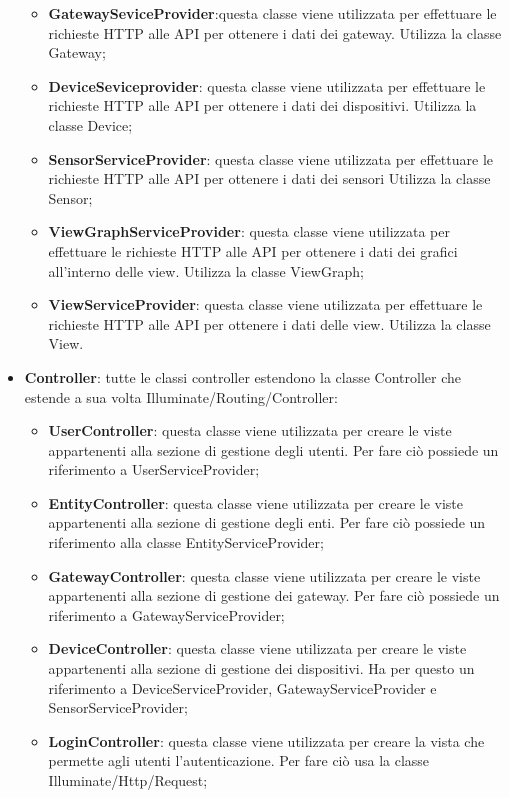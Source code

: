\begin{itemize}
\begin{itemize}
			\item \textbf{GatewaySeviceProvider}:questa classe viene utilizzata per effettuare le richieste HTTP alle API per ottenere i dati dei gateway. Utilizza la classe Gateway;
			\item \textbf{DeviceSeviceprovider}: questa classe viene utilizzata per effettuare le richieste HTTP alle API per ottenere i dati dei dispositivi. Utilizza la classe Device;
			\item \textbf{SensorServiceProvider}: questa classe viene utilizzata per effettuare le richieste HTTP alle API per ottenere i dati dei sensori Utilizza la classe Sensor;
			\item \textbf{ViewGraphServiceProvider}: questa classe viene utilizzata per effettuare le richieste HTTP alle API per ottenere i dati dei grafici all'interno delle view. Utilizza la classe ViewGraph;
			\item \textbf{ViewServiceProvider}: questa classe viene utilizzata per effettuare le richieste HTTP alle API per ottenere i dati delle view. Utilizza la classe View.
		\end{itemize}
		\item \textbf{Controller}: tutte le classi controller estendono la classe Controller che estende a sua volta Illuminate/Routing/Controller:
		\begin{itemize}
			\item \textbf{UserController}: questa classe viene utilizzata per creare le viste appartenenti alla sezione di gestione degli utenti. Per fare ciò possiede un riferimento a UserServiceProvider; 
			\item \textbf{EntityController}: questa classe viene utilizzata per creare le viste appartenenti alla sezione di gestione degli enti. Per fare ciò possiede un riferimento alla classe EntityServiceProvider; 
			\item \textbf{GatewayController}: questa classe viene utilizzata per creare le viste appartenenti alla sezione di gestione dei gateway. Per fare ciò possiede un riferimento a GatewayServiceProvider; 
			\item \textbf{DeviceController}: questa classe viene utilizzata per creare le viste appartenenti alla sezione di gestione dei dispositivi. Ha per questo un riferimento a DeviceServiceProvider, GatewayServiceProvider e SensorServiceProvider;
			\item \textbf{LoginController}: questa classe viene utilizzata per creare la vista che permette agli utenti l'autenticazione. Per fare ciò usa la classe Illuminate/Http/Request; 

\end{itemize}
\end{itemize}
